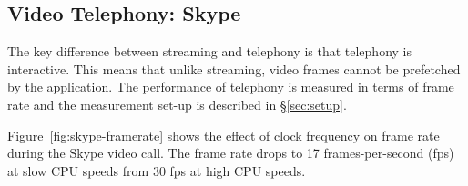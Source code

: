 


\subsection{Video Telephony: Skype}

The key difference between streaming and telephony is that telephony is interactive. This means that unlike streaming,  video frames cannot be prefetched by the application. The performance of telephony is measured in terms of frame rate %
and the measurement set-up is described in \S\ref{sec:setup}.

Figure~\ref{fig:skype-framerate} shows the effect of clock frequency on frame rate during the Skype video call. 
The frame rate drops to 17 frames-per-second (fps) at slow CPU speeds from 30 fps at high CPU speeds. 


